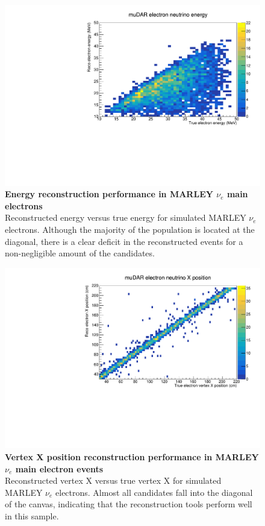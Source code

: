 \begin{figure}[h!]
    \centering
    \includegraphics[width=120mm]{Figures/energy_reco_vs_true.pdf}
    \caption[Energy reconstruction performance in MARLEY $\nu_e$ main electron events]{{\textbf{Energy reconstruction performance in MARLEY $\nu_e$ main electrons}}\\ Reconstructed energy versus true energy for simulated MARLEY $\nu_e$ electrons. Although the majority of the population is located at the diagonal, there is a clear deficit in the reconstructed events for a non-negligible amount of the candidates.}
    \label{reco_vs_true_energy}
\end{figure}

\begin{figure}[h!]
    \centering
    \includegraphics[width=120mm]{Figures/x_reco_vs_true.pdf}
    \caption[Vertex X position reconstruction performance in MARLEY $\nu_e$ main electron events]{{\textbf{Vertex X position reconstruction performance in MARLEY $\nu_e$ main electron events}}\\ Reconstructed vertex X versus true vertex X for simulated MARLEY $\nu_e$ electrons. Almost all candidates fall into the diagonal of the canvas, indicating that the reconstruction tools perform well in this sample.}
    \label{reco_vs_true_vertex_x}
\end{figure}

